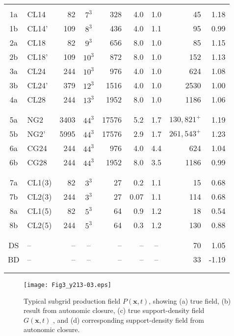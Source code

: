 \begin{table}[tb]
\begin{tabular}{clrcrrcrr}
	\hline \\
		1a 	&	CL14	&	82	&	$7^3$	&	328		&	4.0	&	1.0	&	45		&	1.18 \\
		1b	&	CL14'	&	109	&	$8^3$	&	436		&	4.0	&	1.1	&	95		&	0.99 \\
		2a 	&	CL18	&	82	&	$9^3$	&	656		&	8.0	&	1.0	&	85		&	1.15 \\
		2b	&	CL18'	&	109	&	$10^3$	&	872		&	8.0	&	1.0	&	152		&	1.13 \\
		3a	&	CL24	&	244	&	$10^3$	&	976		&	4.0	&	1.0	&	624		&	1.08 \\
		3b	&	CL24'	&	379	&	$12^3$	&	1516 	&	4.0	&	1.0	&	2530	&	1.00 \\
		4a	&	CL28	&	244	&	$13^3$	&	1952	&	8.0	&	1.0	&	1186	&	1.06 \\ \\
	\hline \\
		5a	&	NG2 	&  3403	&	$44^3$	&	17576	&	5.2	&	1.7	& $130,821^+$ &	1.19 \\
		5b	&	NG2'	&  5995	&	$44^3$	&	17576	&	2.9	&	1.7	& $261,543^+$ &	1.23 \\
		6a	&	CG24	&	244	&	$44^3$	&	976		&	4.0	&	4.4	&	624		&	1.04 \\
		6b	&	CG28	&	244	&	$44^3$	&	1952	&	8.0	&	3.5	&	1186	&	0.99 \\ \\
	\hline \\
		7a 	&	CL1(3)	&	82	&	$3^3$	&	27		&	0.2	&	1.1	&	15		&	0.68 \\
		7b	&	CL2(3)	&	244	&	$3^3$	&	27		&  0.07	&	1.1	&	114		&	0.68 \\
		8a	&	CL1(5)	&	82	&	$5^3$	&	64		&	0.9	&	1.2	&	18		&	0.54 \\
		8b	&	CL2(5)	&	244	&	$5^3$	&	64		&	0.3	&	1.2	&	130		&	0.88 \\ \\
	\hline \\
		DS 	&	--		&	--	&	--		&	--		&	--	&	--	&	70		&	1.05 \\
		BD 	&	--		&	--	&	--		&	--		&	--	&	--	&	33		&  -1.19 \\ \\
	\hline	\\
	\end{tabular}	
\end{table}

%
%         

%
\begin{figure}
	\begin{center} \hspace{1.5cm}
	\texttt{[image: Fig3\_y213-03.eps]}
	\caption{ Typical subgrid production field $P(\mathbf{x},t)$, showing (a) true field, (b) result from autonomic closure, (c) true support-density field $G(\mathbf{x},t)$ , and (d) corresponding support-density field from autonomic closure. }
	\label{F:3}
	\end{center}
\end{figure}
%
%

